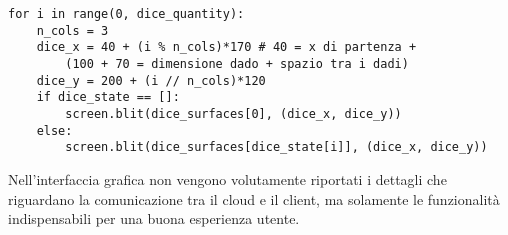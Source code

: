 \begin{verbatim}
for i in range(0, dice_quantity):
    n_cols = 3
    dice_x = 40 + (i % n_cols)*170 # 40 = x di partenza + 
        (100 + 70 = dimensione dado + spazio tra i dadi)
    dice_y = 200 + (i // n_cols)*120
    if dice_state == []:
        screen.blit(dice_surfaces[0], (dice_x, dice_y))
    else:
        screen.blit(dice_surfaces[dice_state[i]], (dice_x, dice_y))
\end{verbatim}
Nell'interfaccia grafica non vengono volutamente riportati i dettagli che riguardano la comunicazione tra il cloud e il client, ma solamente le funzionalità
indispensabili per una buona esperienza utente. 



















